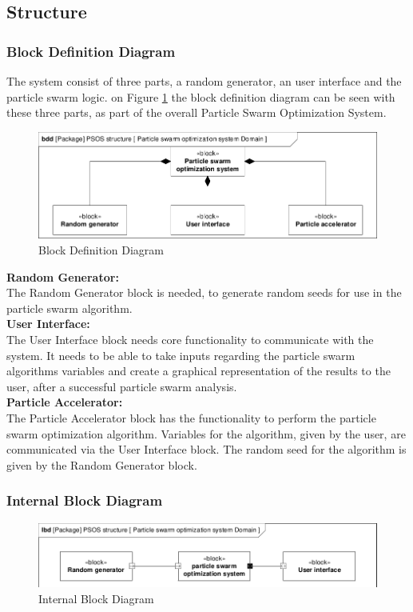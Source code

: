 \subsection{Structure}

\subsubsection{Block Definition Diagram}
The system consist of three parts, a random generator, an user interface and the particle swarm logic. on Figure \ref{fig:bdd} the block definition diagram can be seen with these three parts, as part of the overall Particle Swarm Optimization System.

\begin{figure}[!h]
	\centering
	\includegraphics[width=0.8\linewidth]{diagram/bdd_particle_swarm_optimization_system.pdf}
	\caption{Block Definition Diagram}
	\label{fig:bdd}
\end{figure}

\textbf{Random Generator:}\\
The Random Generator block is needed, to generate random seeds for use in the particle swarm algorithm.\\

\textbf{User Interface:}\\
The User Interface block needs core functionality to communicate with the system. It needs to be able to take inputs regarding the particle swarm algorithms variables and create a graphical representation of the results to the user, after a successful particle swarm analysis.\\

\textbf{Particle Accelerator:}\\
The Particle Accelerator block has the functionality to perform the particle swarm optimization algorithm. Variables for the algorithm, given by the user, are communicated via the User Interface block. The random seed for the algorithm is given by the Random Generator block.

\subsubsection{Internal Block Diagram}


\begin{figure}[!h]
	\centering
	\includegraphics[width=0.8\linewidth]{diagram/ibd_particle_swarm_optimization_system.pdf}
	\caption{Internal Block Diagram}
	\label{fig:ibd}
\end{figure}
